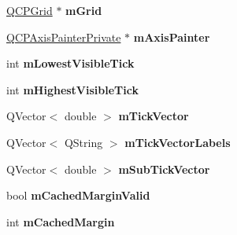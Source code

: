 \begin{DoxyCompactItemize}
\item 
\hyperlink{class_q_c_p_grid}{Q\+C\+P\+Grid} $\ast$ {\bfseries m\+Grid}\hypertarget{class_q_c_p_axis_a17bffb94aaa40311f259c6ac7bcb5d5f}{}\label{class_q_c_p_axis_a17bffb94aaa40311f259c6ac7bcb5d5f}

\item 
\hyperlink{class_q_c_p_axis_painter_private}{Q\+C\+P\+Axis\+Painter\+Private} $\ast$ {\bfseries m\+Axis\+Painter}\hypertarget{class_q_c_p_axis_aeeae00935bd2dab82d64f32544a90913}{}\label{class_q_c_p_axis_aeeae00935bd2dab82d64f32544a90913}

\item 
int {\bfseries m\+Lowest\+Visible\+Tick}\hypertarget{class_q_c_p_axis_aebb24ba8734b7e054efc6e1ecc5414c7}{}\label{class_q_c_p_axis_aebb24ba8734b7e054efc6e1ecc5414c7}

\item 
int {\bfseries m\+Highest\+Visible\+Tick}\hypertarget{class_q_c_p_axis_abb3b3ccce7e9779fef2be91ce1a46ef0}{}\label{class_q_c_p_axis_abb3b3ccce7e9779fef2be91ce1a46ef0}

\item 
Q\+Vector$<$ double $>$ {\bfseries m\+Tick\+Vector}\hypertarget{class_q_c_p_axis_aae0f9b9973b85be601200f00f5825087}{}\label{class_q_c_p_axis_aae0f9b9973b85be601200f00f5825087}

\item 
Q\+Vector$<$ Q\+String $>$ {\bfseries m\+Tick\+Vector\+Labels}\hypertarget{class_q_c_p_axis_aeee4bd0fca3f587eafe33843d1cb4f82}{}\label{class_q_c_p_axis_aeee4bd0fca3f587eafe33843d1cb4f82}

\item 
Q\+Vector$<$ double $>$ {\bfseries m\+Sub\+Tick\+Vector}\hypertarget{class_q_c_p_axis_a28353081e0ff35c3fe5ced923a287faa}{}\label{class_q_c_p_axis_a28353081e0ff35c3fe5ced923a287faa}

\item 
bool {\bfseries m\+Cached\+Margin\+Valid}\hypertarget{class_q_c_p_axis_a2cde37b6e385f47e11322df4ac1b0e9b}{}\label{class_q_c_p_axis_a2cde37b6e385f47e11322df4ac1b0e9b}

\item 
int {\bfseries m\+Cached\+Margin}\hypertarget{class_q_c_p_axis_a48ace55cbd54f7241e7f1b06fd369b64}{}\label{class_q_c_p_axis_a48ace55cbd54f7241e7f1b06fd369b64}

\end{DoxyCompactItemize}
